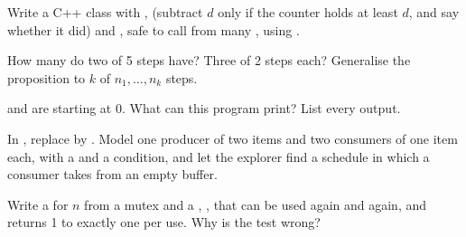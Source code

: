 \begin{exercise}[$\star$]\label{exo:b2:threads-and-synchronisation:3}
Write a C++ class  with ,  (subtract $d$ only if the counter holds at
least $d$, and say whether it did) and , safe to call from many , using .
\end{exercise}

\begin{exercise}[$\star$]\label{exo:b2:threads-and-synchronisation:4}
How many  do two  of 5 steps have? Three  of 2 steps each? Generalise the proposition to
$k$  of $n_1, \dots, n_k$ steps.
\end{exercise}

\begin{exercise}[$\star\star$]\label{exo:b2:threads-and-synchronisation:5}
 and  are  starting at 0. What can this program print? List every output.
\end{exercise}

\begin{exercise}[$\star\star$]\label{exo:b2:threads-and-synchronisation:6}
In , replace  by . Model one producer of two
items and two consumers of one item each, with a  and a condition, and let the explorer find a schedule in which
a consumer takes from an empty buffer.
\end{exercise}

\begin{exercise}[$\star\star$]\label{exo:b2:threads-and-synchronisation:7}
Write a  for $n$  from a mutex and a , , that can be used
again and again, and returns 1 to exactly one  per use. Why is the test  wrong?
\end{exercise}

